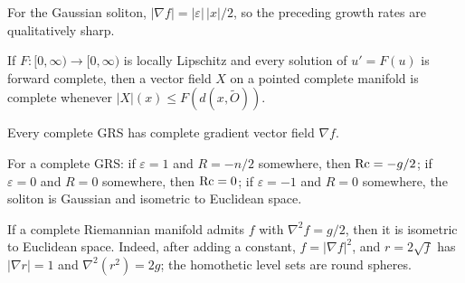 \begin{remark}
\label{rem:chow-iv-gradient-potential-sharp}
For the Gaussian soliton, $|\nabla f|=|\varepsilon|\,|x|/2$, so the preceding
growth rates are qualitatively sharp.
\end{remark}

\begin{lemma}
\label{lem:chow-iv-vector-field-completeness}
If $F:[0,\infty)\to[0,\infty)$ is locally Lipschitz and every solution of
$u'=F(u)$ is forward complete, then a vector field $X$ on a pointed complete
manifold is complete whenever $|X|(x)\le F(d(x,\widetilde O))$.
\end{lemma}

\begin{corollary}
\label{cor:chow-iv-gradient-complete}
Every complete GRS has complete gradient vector field $\nabla f$.
\end{corollary}

\begin{proposition}
\label{prop:chow-iv-scalar-lower-equality}
For a complete GRS: if $\varepsilon=1$ and $R=-n/2$ somewhere, then
$\operatorname{Rc}=-g/2$; if $\varepsilon=0$ and $R=0$ somewhere, then $\operatorname{Rc}=0$; if
$\varepsilon=-1$ and $R=0$ somewhere, the soliton is Gaussian and isometric to
Euclidean space.
\end{proposition}

\begin{lemma}
\label{lem:chow-iv-hessian-characterizes-euclidean}
If a complete Riemannian manifold admits $f$ with $\nabla^2f=g/2$, then it is
isometric to Euclidean space.  Indeed, after adding a constant,
$f=|\nabla f|^2$, and $r=2\sqrt f$ has $|\nabla r|=1$ and
$\nabla^2(r^2)=2g$; the homothetic level sets are round spheres.
\end{lemma}


